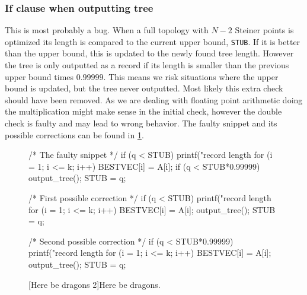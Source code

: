 \subsubsection{If clause when outputting tree}
\label{sec:if-clause-when}

This is most probably a bug.  When a full topology with $N-2$ Steiner points is
optimized its length is compared to the current upper bound, \texttt{STUB}. If
it is better than the upper bound, this is updated to the newly found tree
length.  However the tree is only outputted as a record if its length is smaller
than the previous upper bound times $0.99999$.  This means we risk situations
where the upper bound is updated, but the tree never outputted.  Most likely
this extra check should have been removed.  As we are dealing with floating
point arithmetic doing the multiplication might make sense in the initial check,
however the double check is faulty and may lead to wrong behavior. The faulty
snippet and its possible corrections can be found in \cref{fig:if-clause-snippet}.

\begin{figure}[htbp]
\begin{c-code}
/* The faulty snippet */
if (q < STUB) {
  printf("\nnew record length %
  for (i = 1; i <= k; i++) BESTVEC[i] = A[i];
  if (q < STUB*0.99999) output_tree();
  STUB = q;
}

/* First possible correction */
if (q < STUB) {
  printf("\nnew record length %
  for (i = 1; i <= k; i++) BESTVEC[i] = A[i];
  output_tree();
  STUB = q;
}

/* Second possible correction */
if (q < STUB*0.99999) {
  printf("\nnew record length %
  for (i = 1; i <= k; i++) BESTVEC[i] = A[i];
  output_tree();
  STUB = q;
}
\end{c-code}
  [Here be dragons 2]{Here be dragons.\label{fig:if-clause-snippet}}
\end{figure}

\chapterbreak{}


